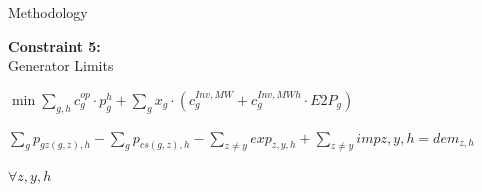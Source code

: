 \documentclass[aspectratio=169]{beamer}
\begin{document}
\begin{frame}{Methodology}
\begin{minipage}[t]{0.2\textwidth}
        \vspace{-0.55cm}
        \begin{coloredblockdark}[blue][][][][2.35cm][][0ex][0ex]
                \begin{minipage}[c][2.35cm][c]{0.4\textwidth}
                    \centering
                    \Large{}
                \end{minipage}%
                \hfill
                \begin{minipage}[c][2.35cm][c]{0.55\textwidth}
                    \centering
                    \tiny\textbf{Constraint 5:}\\ 
                    Generator Limits
                \end{minipage}%
                \hspace{0.05\textwidth}
        \end{coloredblockdark}
    \end{minipage}
    \hfill
    \begin{minipage}[t]{0.78\textwidth}
        \begin{coloredblock}[blue][][][c][2.35cm][][0ex][0ex]
            \begin{center}
                \footnotesize$\min \sum_{g,h} c_{g}^{op} \cdot p_g^{h} + \sum_{g} x_g \cdot (c_{g}^{Inv,MW} + c_{g}^{Inv,MWh} \cdot E2P_g)$
            \end{center}
        \end{coloredblock}
        \vspace{-0.55cm}
        \begin{coloredblock}[blue][][][c][2.35cm][][0ex][0ex]
            \begin{minipage}[t]{.89\textwidth}
                \begin{center}
                    \footnotesize$\sum_{g} p_{gz(g,z),h} - \sum_{g} p_{cs(g,z),h} - \sum_{z \neq y} exp_{z,y,h} + \sum_{z \neq y} imp{z,y,h} = dem_{z,h}$
                \end{center}
            \end{minipage}
            \hfill
            \begin{minipage}[t]{.1\textwidth}
                \footnotesize $\forall z,y,h$
            \end{minipage}
        \end{coloredblock}
        \vspace{-0.55cm}
        \begin{coloredblock}[blue][][][c][2.35cm][][0ex][0ex]
            \begin{minipage}[t]{.89\textwidth}

\end{minipage}
\end{coloredblock}
\end{minipage}
\end{frame}
\end{document}
